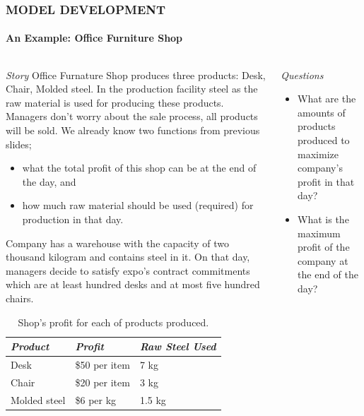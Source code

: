 \documentclass[14 pt]{beamer}
\begin{document}
\begin{frame}[t]
\frametitle{MODEL DEVELOPMENT}
\framesubtitle{An Example: Office Furniture Shop}

\begin{columns}[t]
\begin{column}{0.45\textwidth}
\emph{Story}
\vskip0.5cm%
Office Furnature Shop produces three products: Desk, Chair, Molded steel. In the production facility steel as the raw material is used for producing these products. Managers don't worry about the sale process, all products will be sold. We already know two functions from previous slides;
\begin{itemize}
  \item what the total profit of this shop can be at the end of the day, and
  \item how much raw material should be used (required) for production in that day.
\end{itemize}
Company has a warehouse with the capacity of two thousand kilogram and contains steel in it. On that day, managers decide to satisfy expo's contract commitments which are at least hundred desks and at most five hundred chairs.
\begin{table}
\begin{tabular}{p{}p{}p{}}
  \hline
  \emph{Product} & \emph{Profit} & \emph{Raw Steel Used} \\
  \hline
  Desk  & \$50 per item & 7 kg \\
  Chair & \$20 per item & 3 kg\\
  Molded steel & \$6 per kg & 1.5 kg\\
  \hline
\end{tabular}
\caption{Shop's profit for each of products produced.}  
\end{table}
\end{column}

\begin{column}{0.45\textwidth}
\emph{Questions}
\vskip0.5cm%
\begin{itemize}
  \item What are the amounts of products produced to maximize company's profit in that day?
  \item What is the maximum profit of the company at the end of the day?
\end{itemize}
\end{column}
\end{columns}
\end{frame}
\end{document}
